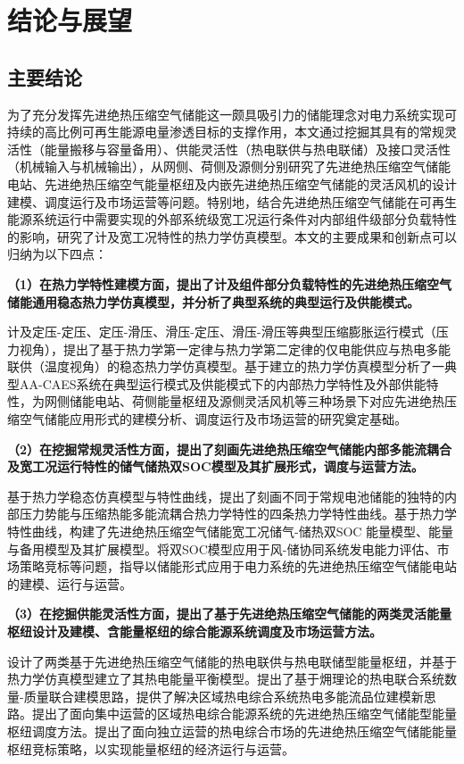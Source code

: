 \chapter{结论与展望}
\label{cha:conclusion}

\section{主要结论}
\label{sec:conclusion}
为了充分发挥先进绝热压缩空气储能这一颇具吸引力的储能理念对电力系统实现可持续的高比例可再生能源电量渗透目标的支撑作用，本文通过挖掘其具有的常规灵活性（能量搬移与容量备用）、供能灵活性（热电联供与热电联储）及接口灵活性（机械输入与机械输出），从网侧、荷侧及源侧分别研究了先进绝热压缩空气储能电站、先进绝热压缩空气能量枢纽及内嵌先进绝热压缩空气储能的灵活风机的设计建模、调度运行及市场运营等问题。特别地，结合先进绝热压缩空气储能在可再生能源系统运行中需要实现的外部系统级宽工况运行条件对内部组件级部分负载特性的影响，研究了计及宽工况特性的热力学仿真模型。本文的主要成果和创新点可以归纳为以下四点：

\textbf{（1）在热力学特性建模方面，提出了计及组件部分负载特性的先进绝热压缩空气储能通用稳态热力学仿真模型，并分析了典型系统的典型运行及供能模式。}

计及定压-定压、定压-滑压、滑压-定压、滑压-滑压等典型压缩膨胀运行模式（压力视角），提出了基于热力学第一定律与热力学第二定律的仅电能供应与热电多能联供（温度视角）的稳态热力学仿真模型。基于建立的热力学仿真模型分析了一典型AA-CAES系统在典型运行模式及供能模式下的内部热力学特性及外部供能特性，为网侧储能电站、荷侧能量枢纽及源侧灵活风机等三种场景下对应先进绝热压缩空气储能应用形式的建模分析、调度运行及市场运营的研究奠定基础。

\textbf{（2）在挖掘常规灵活性方面，提出了刻画先进绝热压缩空气储能内部多能流耦合及宽工况运行特性的储气储热双SOC模型及其扩展形式，调度与运营方法。}

基于热力学稳态仿真模型与特性曲线，提出了刻画不同于常规电池储能的独特的内部压力势能与压缩热能多能流耦合热力学特性的四条热力学特性曲线。基于热力学特性曲线，构建了先进绝热压缩空气储能宽工况储气-储热双SOC 能量模型、能量与备用模型及其扩展模型。将双SOC模型应用于风-储协同系统发电能力评估、市场策略竞标等问题，指导以储能形式应用于电力系统的先进绝热压缩空气储能电站的建模、运行与运营。

\textbf{（3）在挖掘供能灵活性方面，提出了基于先进绝热压缩空气储能的两类灵活能量枢纽设计及建模、含能量枢纽的综合能源系统调度及市场运营方法。}

设计了两类基于先进绝热压缩空气储能的热电联供与热电联储型能量枢纽，并基于热力学仿真模型建立了其热电能量平衡模型。提出了基于㶲理论的热电联合系统数量-质量联合建模思路，提供了解决区域热电综合系统热电多能流品位建模新思路。提出了面向集中运营的区域热电综合能源系统的先进绝热压缩空气储能型能量枢纽调度方法。提出了面向独立运营的热电综合市场的先进绝热压缩空气储能能量枢纽竞标策略，以实现能量枢纽的经济运行与运营。

